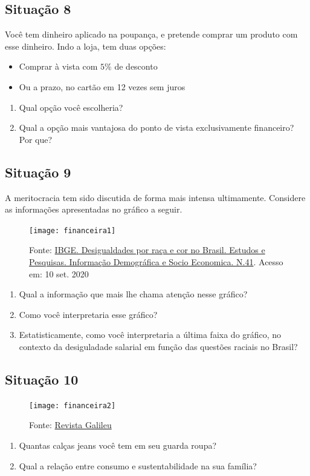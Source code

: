 \subsection{Situação 8}
Você tem dinheiro aplicado na poupança, e pretende comprar um produto com esse dinheiro. Indo a loja, tem duas opções:
\begin{itemize}
\item Comprar à vista com $5\%$ de desconto
\item Ou a prazo, no cartão em 12 vezes sem juros
\end{itemize}

\begin{enumerate}
\item Qual opção você escolheria?
\item Qual a opção mais vantajosa do ponto de vista exclusivamente financeiro? Por que?
\end{enumerate}

\subsection{Situação 9}
A meritocracia tem sido discutida de forma mais intensa ultimamente. Considere as informações apresentadas no gráfico a seguir.

\begin{figure}[H]
\centering

\texttt{[image: financeira1]}
\caption{Fonte: \href{https://biblioteca.ibge.gov.br/visualizacao/livros/liv101681_informativo.pdf}{IBGE. Desigualdades por raça e cor no Brasil. Estudos e Pesquisas. Informação Demográfica e Socio Economica. N.41}. Acesso em: 10 set. 2020}
\end{figure}

\begin{enumerate}
  \item Qual a informação que mais lhe chama atenção nesse gráfico?
  \item Como você interpretaria esse gráfico?
  \item Estatisticamente, como você interpretaria a última faixa do gráfico, no contexto da desiguladade salarial em função das questões raciais no Brasil?
\end{enumerate}

\subsection{Situação 10}
\begin{figure}[H]
\centering

\texttt{[image: financeira2]}
\caption{Fonte: \href{https://revistagalileu.globo.com/Ciencia/Meio-Ambiente/noticia/2019/08/sua-calca-jeans-gastou-mais-de-5-mil-litros-de-agua-para-ser-produzida-entenda.html}{Revista Galileu}}

\end{figure}
\begin{enumerate}
  \item Quantas calças jeans você tem em seu guarda roupa?
  \item Qual a relação entre consumo e sustentabilidade na sua família?
\end{enumerate}

